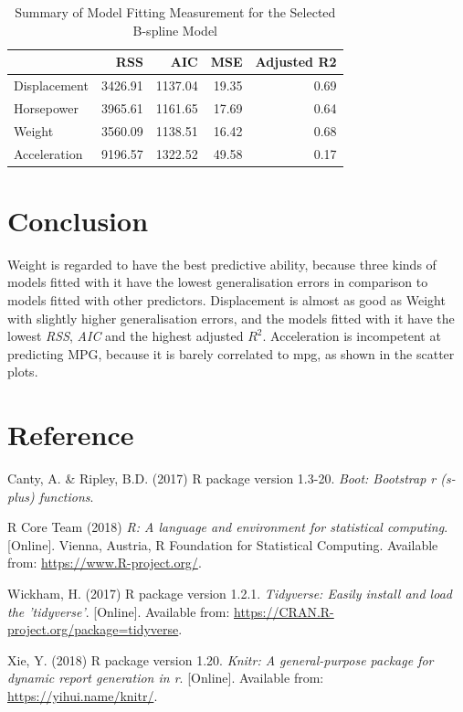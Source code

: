 \documentclass[]{article}
\begin{document}
\begin{longtable}[t]{lrrrr}
\caption{\label{tab:bs-sum}Summary of Model Fitting Measurement for the Selected B-spline Model}\\
\toprule
  & RSS & AIC & MSE & Adjusted R2\\
\midrule
Displacement & 3426.91 & 1137.04 & 19.35 & 0.69\\
Horsepower & 3965.61 & 1161.65 & 17.69 & 0.64\\
Weight & 3560.09 & 1138.51 & 16.42 & 0.68\\
Acceleration & 9196.57 & 1322.52 & 49.58 & 0.17\\
\bottomrule
\end{longtable}

\hypertarget{conclusion}{%
\section{Conclusion}\label{conclusion}}

Weight is regarded to have the best predictive ability, because three
kinds of models fitted with it have the lowest generalisation errors in
comparison to models fitted with other predictors. Displacement is
almost as good as Weight with slightly higher generalisation errors, and
the models fitted with it have the lowest \emph{RSS}, \emph{AIC} and the
highest adjusted \(R^2\). Acceleration is incompetent at predicting MPG,
because it is barely correlated to mpg, as shown in the scatter plots.

\hypertarget{reference}{%
\section{Reference}\label{reference}}

\hypertarget{refs}{}
\leavevmode\hypertarget{ref-boot}{}%
Canty, A. \& Ripley, B.D. (2017) R package version 1.3-20. \emph{Boot:
Bootstrap r (s-plus) functions}.

\leavevmode\hypertarget{ref-r}{}%
R Core Team (2018) \emph{R: A language and environment for statistical
computing}. {[}Online{]}. Vienna, Austria, R Foundation for Statistical
Computing. Available from: \url{https://www.R-project.org/}.

\leavevmode\hypertarget{ref-tidyverse}{}%
Wickham, H. (2017) R package version 1.2.1. \emph{Tidyverse: Easily
install and load the 'tidyverse'}. {[}Online{]}. Available from:
\url{https://CRAN.R-project.org/package=tidyverse}.

\leavevmode\hypertarget{ref-knitr}{}%
Xie, Y. (2018) R package version 1.20. \emph{Knitr: A general-purpose
package for dynamic report generation in r}. {[}Online{]}. Available
from: \url{https://yihui.name/knitr/}.
\end{document}
